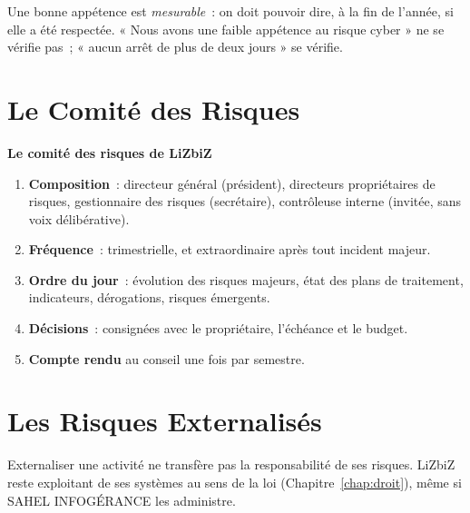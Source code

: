 Une bonne appétence est \emph{mesurable}~: on doit pouvoir dire, à la fin
de l'année, si elle a été respectée. « Nous avons une faible appétence au
risque cyber » ne se vérifie pas~; « aucun arrêt de plus de deux jours »
se vérifie.

\section{Le Comité des Risques}
\label{sec:c03-comite}

\begin{boxprocedure}
\textbf{Le comité des risques de LiZbiZ}
\begin{enumerate}
    \item \textbf{Composition}~: directeur général (président), directeurs
          propriétaires de risques, gestionnaire des risques (secrétaire),
          contrôleuse interne (invitée, sans voix délibérative).
    \item \textbf{Fréquence}~: trimestrielle, et extraordinaire après tout
          incident majeur.
    \item \textbf{Ordre du jour}~: évolution des risques majeurs, état des
          plans de traitement, indicateurs, dérogations, risques
          émergents.
    \item \textbf{Décisions}~: consignées avec le propriétaire, l'échéance
          et le budget.
    \item \textbf{Compte rendu} au conseil une fois par semestre.
\end{enumerate}
\end{boxprocedure}

\section{Les Risques Externalisés}
\label{sec:c03-tiers}

Externaliser une activité ne transfère pas la responsabilité de ses
risques. LiZbiZ reste exploitant de ses systèmes au sens de la loi
(Chapitre~\ref{chap:droit}), même si SAHEL INFOGÉRANCE les administre.

